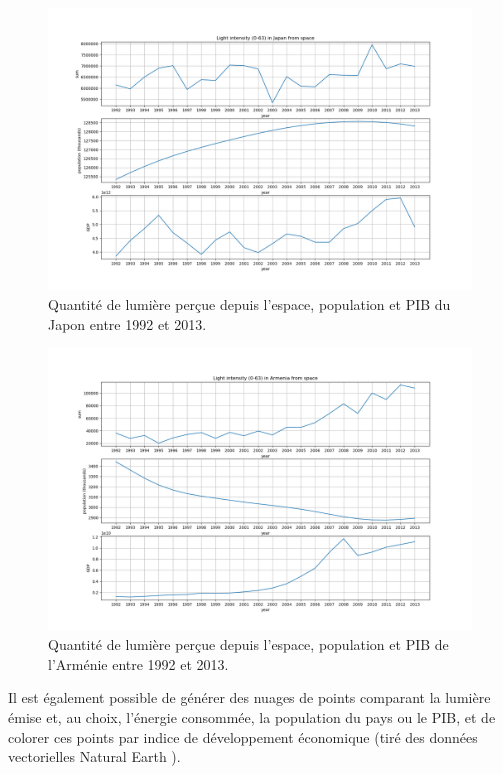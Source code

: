 \documentclass[a4paper, 11pt]{report}
\begin{document}
\begin{figure}
	\centering
	\includegraphics[width=1.0\textwidth]{img/sum_Japan.png}
	\caption{Quantité de lumière perçue depuis l'espace, population et PIB du Japon entre 1992 et 2013.}
	\label{sum_Japan}
\end{figure}


\begin{figure}
	\centering
	\includegraphics[width=1.0\textwidth]{img/sum_Armenia.png}
	\caption{Quantité de lumière perçue depuis l'espace, population et PIB de l'Arménie entre 1992 et 2013.}
	\label{sum_Armenia}
\end{figure}

Il est également possible de générer des nuages de points comparant la lumière émise et, au choix, l'énergie consommée, la population du pays ou le PIB, et de colorer ces points par indice de développement économique (tiré des données vectorielles Natural Earth \cite{naturalearthdata}).
\end{document}
